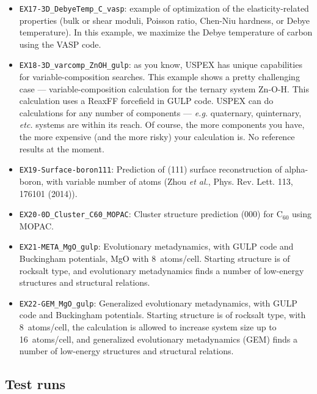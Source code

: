 \documentclass[12pt]{article}
\begin{document}
\begin{itemize}
\item \texttt{EX17-3D\_DebyeTemp\_C\_vasp}: example of optimization of the
elasticity-related properties (bulk or shear moduli, Poisson ratio, Chen-Niu
hardness, or Debye temperature). In this example, we maximize the Debye
temperature of carbon using the VASP code.

\item \texttt{EX18-3D\_varcomp\_ZnOH\_gulp}: as you know, USPEX has unique
capabilities for variable-composition searches. This example shows a pretty
challenging case --- variable-composition calculation for the ternary system
Zn-O-H. This calculation uses a ReaxFF forcefield in GULP code. USPEX can do
calculations for any number of components --- \emph{e.g.} quaternary,
quinternary, \emph{etc.} systems are within its reach. Of course, the more
components you have, the more expensive (and the more risky) your calculation
is. No reference results at the moment.

\item \texttt{EX19-Surface-boron111}: Prediction of (111) surface reconstruction
of alpha-boron, with variable number of atoms (Zhou \emph{et al.}, Phys. Rev.
Lett. 113, 176101 (2014)).

\item \texttt{EX20-0D\_Cluster\_C60\_MOPAC}: Cluster structure prediction (000)
for C$_{60}$ using MOPAC.

\item \texttt{EX21-META\_MgO\_gulp}: Evolutionary metadynamics, with GULP code
and Buckingham potentials, MgO with 8~atoms/cell. Starting structure is of
rocksalt type, and evolutionary metadynamics finds a number of low-energy
structures and structural relations.

\item \texttt{EX22-GEM\_MgO\_gulp}: Generalized evolutionary metadynamics, with
GULP code and Buckingham potentials. Starting structure is of rocksalt type,
with 8~atoms/cell, the calculation is allowed to increase system size up to
16~atoms/cell, and generalized evolutionary metadynamics (GEM) finds a number of
low-energy structures and structural relations.

\end{itemize}

\newpage
\subsection{Test runs}
\end{document}
